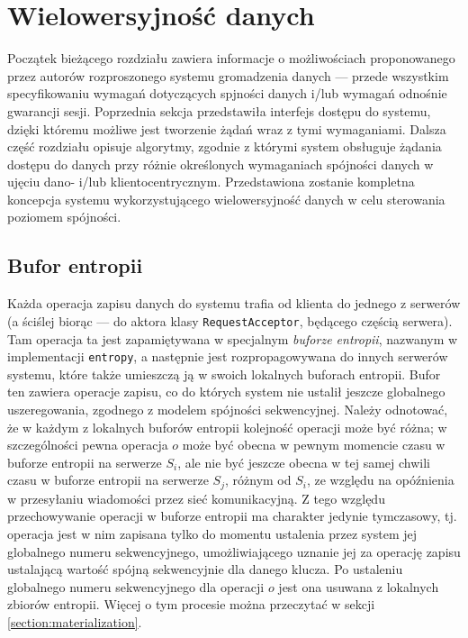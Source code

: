
\section{Wielowersyjność danych} \label{section:multiversioning_realization}

Początek bieżącego rozdziału zawiera informacje o możliwościach proponowanego przez autorów rozproszonego systemu gromadzenia danych --- przede wszystkim specyfikowaniu wymagań dotyczących spjności danych i/lub wymagań odnośnie gwarancji sesji. Poprzednia sekcja przedstawiła interfejs dostępu do systemu, dzięki któremu możliwe jest tworzenie żądań wraz z tymi wymaganiami. Dalsza część rozdziału opisuje algorytmy, zgodnie z którymi system obsługuje żądania dostępu do danych przy różnie określonych wymaganiach spójności danych w ujęciu dano- i/lub klientocentrycznym. Przedstawiona zostanie kompletna koncepcja systemu wykorzystującego wielowersyjność danych w celu sterowania poziomem spójności.

\subsection{Bufor entropii}

Każda operacja zapisu danych do systemu trafia od klienta do jednego z serwerów (a ściślej biorąc --- do aktora klasy \texttt{RequestAcceptor}, będącego częścią serwera). Tam operacja ta jest zapamiętywana w specjalnym \textit{buforze entropii}, nazwanym w implementacji \texttt{entropy}, a następnie jest rozpropagowywana do innych serwerów systemu, które także umieszczą ją w swoich lokalnych buforach entropii. Bufor ten zawiera operacje zapisu, co do których system nie ustalił jeszcze globalnego uszeregowania, zgodnego z modelem spójności sekwencyjnej. Należy odnotować, że w każdym z lokalnych buforów entropii kolejność operacji może być różna; w szczególności pewna operacja $ o $ może być obecna w pewnym momencie czasu w buforze entropii na serwerze $ S_i $, ale nie być jeszcze obecna w tej samej chwili czasu w buforze entropii na serwerze $ S_j $, różnym od $ S_i $, ze względu na opóźnienia w przesyłaniu wiadomości przez sieć komunikacyjną. Z tego względu przechowywanie operacji w buforze entropii ma charakter jedynie tymczasowy, tj. operacja jest w nim zapisana tylko do momentu ustalenia przez system jej globalnego numeru sekwencyjnego, umożliwiającego uznanie jej za operację zapisu ustalającą wartość spójną sekwencyjnie dla danego klucza. Po ustaleniu globalnego numeru sekwencyjnego dla operacji $ o $ jest ona usuwana z lokalnych zbiorów entropii. Więcej o tym procesie można przeczytać w sekcji \ref{section:materialization}.

